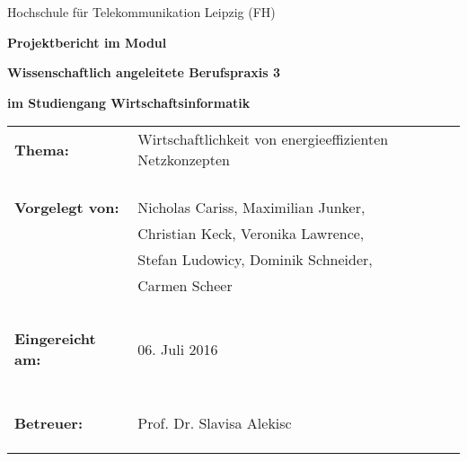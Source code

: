 
\thispagestyle{empty}
\vspace{1cm}

\begin{center}
\Large{Hochschule für Telekommunikation Leipzig (FH)}
\vspace{1.5cm}
\end{center}

\begin{center}
\large{\textbf{Projektbericht im Modul}}
\end{center}

\begin{center}
\vspace{-2mm}
 \Large \textbf{Wissenschaftlich angeleitete Berufspraxis 3}
\end{center}

\begin{center}
\vspace{5mm}
\textbf{im Studiengang Wirtschaftsinformatik}
\end{center}

\vspace{2cm}
\begin{tabular}{p{}p{}}
\textbf{Thema:} & 
	
Wirtschaftlichkeit von energieeffizienten Netzkonzepten
\\
&
	
\\ &
\\ &
\\

\vspace{4,5cm}\\

\textbf{Vorgelegt von:} & Nicholas Cariss, Maximilian Junker, \\ 
&Christian Keck, Veronika Lawrence,\\
&Stefan Ludowicy, Dominik Schneider,\\
&Carmen Scheer\\
&\\
 & \\
& \\
 & \\
&\\

\textbf{Eingereicht am:} & 06. Juli 2016 \\
&\\
&\\
&\\
\\
& \\
& \\
& \\

\textbf{Betreuer:} & Prof. Dr. Slavisa Alekisc \\
&\\
&\\

 & \\
\end{tabular}
 